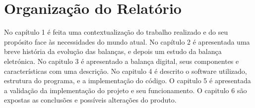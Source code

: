 \section{Organização do Relatório}
No capítulo 1 é feita uma contextualização do trabalho realizado e do seu propósito face às necessidades do mundo atual.
\emptyline
No capítulo 2 é apresentada uma breve história da evolução das balanças, e depois um estudo da balança eletrónica.
\emptyline
No capitulo 3 é apresentado a balança digital, seus componentes e características com uma descrição.
\emptyline
No capitulo 4 é descrito o software utilizado, estrutura do programa, e a implementação do código.
\emptyline
O capitulo 5 é apresentada a validação da implementação do projeto e seu funcionamento.
\emptyline
O capitulo 6 são expostas as conclusões e possíveis alterações do produto.
